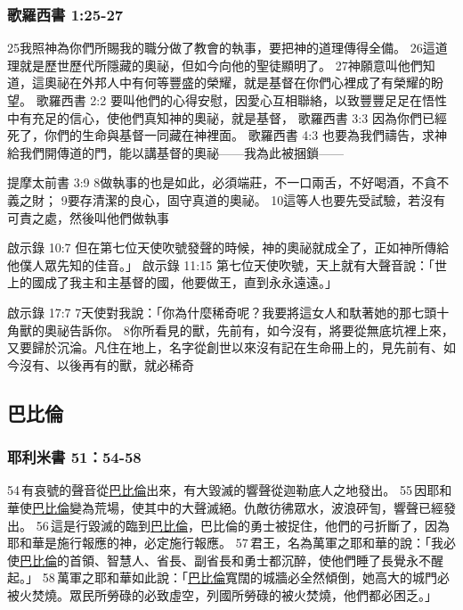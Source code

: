 \subsubsection{歌羅西書 1:25-27}
25我照神為你們所賜我的職分做了教會的執事，要把神的道理傳得全備。 26這道理就是歷世歷代所隱藏的奧祕，但如今向他的聖徒顯明了。 27神願意叫他們知道，這奧祕在外邦人中有何等豐盛的榮耀，就是基督在你們心裡成了有榮耀的盼望。
歌羅西書 2:2
要叫他們的心得安慰，因愛心互相聯絡，以致豐豐足足在悟性中有充足的信心，使他們真知神的奧祕，就是基督，
歌羅西書 3:3
因為你們已經死了，你們的生命與基督一同藏在神裡面。
歌羅西書 4:3
也要為我們禱告，求神給我們開傳道的門，能以講基督的奧祕——我為此被捆鎖——

提摩太前書 3:9
8做執事的也是如此，必須端莊，不一口兩舌，不好喝酒，不貪不義之財； 9要存清潔的良心，固守真道的奧祕。 10這等人也要先受試驗，若沒有可責之處，然後叫他們做執事

啟示錄 10:7
但在第七位天使吹號發聲的時候，神的奧祕就成全了，正如神所傳給他僕人眾先知的佳音。」
啟示錄 11:15
第七位天使吹號，天上就有大聲音說：「世上的國成了我主和主基督的國，他要做王，直到永永遠遠。」

啟示錄 17:7
7天使對我說：「你為什麼稀奇呢？我要將這女人和馱著她的那七頭十角獸的奧祕告訴你。 8你所看見的獸，先前有，如今沒有，將要從無底坑裡上來，又要歸於沉淪。凡住在地上，名字從創世以來沒有記在生命冊上的，見先前有、如今沒有、以後再有的獸，就必稀奇












\subsection{巴比倫}

\subsubsection{耶利米書 51：54-58}
54 有哀號的聲音從\underline{巴比倫}出來，有大毀滅的響聲從迦勒底人之地發出。 55 因耶和華使\underline{巴比倫}變為荒場，使其中的大聲滅絕。仇敵彷彿眾水，波浪砰訇，響聲已經發出。 56 這是行毀滅的臨到\underline{巴比倫}，巴比倫的勇士被捉住，他們的弓折斷了，因為耶和華是施行報應的神，必定施行報應。 57 君王，名為萬軍之耶和華的說：「我必使\underline{巴比倫}的首領、智慧人、省長、副省長和勇士都沉醉，使他們睡了長覺永不醒起。」 58 萬軍之耶和華如此說：「\underline{巴比倫}寬闊的城牆必全然傾倒，她高大的城門必被火焚燒。眾民所勞碌的必致虛空，列國所勞碌的被火焚燒，他們都必困乏。」





